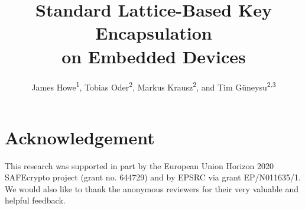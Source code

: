 \documentclass{iacrtrans}
\begin{document}
%

\title{Standard Lattice-Based Key Encapsulation\\ on Embedded Devices}

\author{
James Howe\textsuperscript{1}, Tobias Oder\textsuperscript{2}, Markus Krausz\textsuperscript{2}, and Tim G\"uneysu\textsuperscript{2,3}
}



\maketitle









\section*{Acknowledgement}
This research was supported in part by the European Union Horizon 2020 SAFEcrypto project (grant no. 644729) and by EPSRC via grant EP/N011635/1. We would also like to thank the anonymous reviewers for their very valuable and helpful feedback.




\end{document}

